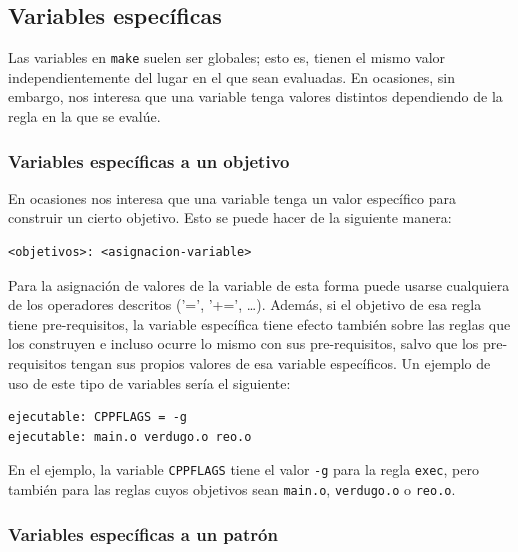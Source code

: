 \documentclass[11pt,twoside,titlepage,a4paper]{article}
\theoremstyle{definition}
\theoremstyle{plain_rojo}
\theoremstyle{remark}
\begin{document}
\subsection{Variables específicas}

Las variables en \texttt{make} suelen ser globales; esto es, tienen el mismo 
valor independientemente del lugar en el que sean evaluadas. En ocasiones, 
sin embargo, nos interesa que una variable tenga valores distintos 
dependiendo de la regla en la que se evalúe.

\subsubsection{Variables específicas a un objetivo}

En ocasiones nos interesa que una variable tenga un valor específico para 
construir un cierto objetivo. Esto se puede hacer de la siguiente manera:
\bigskip
\begin{lstlisting}
<objetivos>: <asignacion-variable>
\end{lstlisting}
\bigskip
Para la asignación de valores de la variable de esta forma puede usarse 
cualquiera de los operadores descritos ('=', '+=', \ldots). Además, si el 
objetivo de esa regla tiene pre-requisitos, la variable específica tiene 
efecto también sobre las reglas que los construyen e incluso ocurre lo mismo 
con sus pre-requisitos, salvo que los pre-requisitos tengan sus propios 
valores de esa variable específicos. Un ejemplo de uso de este tipo de 
variables sería el siguiente:
\bigskip
\begin{lstlisting}
ejecutable: CPPFLAGS = -g
ejecutable: main.o verdugo.o reo.o
\end{lstlisting}
\bigskip
En el ejemplo, la variable \texttt{CPPFLAGS} tiene el valor \texttt{-g} para
la regla \texttt{exec}, pero también para las reglas cuyos objetivos sean 
\texttt{main.o}, \texttt{verdugo.o} o \texttt{reo.o}.
\newpage
\subsubsection{Variables específicas a un patrón}
\end{document}
